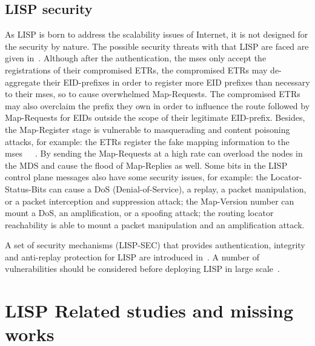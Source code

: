 \subsection{LISP security}
\label{subsubsec:impact_security}
As LISP is born to address the scalability issues of Internet, it is not designed for the security by nature. The possible security threats with that LISP are faced are given in~\cite{rfc7835}. Although after the authentication, the \acrshort{ms}es only accept the registrations of their compromised ETRs, the compromised ETRs may de-aggregate their EID-prefixes in order to register more EID prefixes than necessary to their \acrshort{ms}es, so to cause overwhelmed Map-Requests. The compromised ETRs may also overclaim the prefix they own in order to influence the route followed by Map-Requests for EIDs outside the scope of their legitimate EID-prefix. Besides, the Map-Register stage is vulnerable to masquerading and content poisoning attacks, for example: the ETRs register the fake mapping information to the \acrshort{ms}es~\cite{aiash2013securing}~\cite{montero2013securing}~\cite{aiash2013novel}. By sending the Map-Requests at a high rate can overload the nodes in the MDS and cause the flood of Map-Replies as well. Some bits in the LISP control plane messages also have some security issues, for example: the Locator-Status-Bits can cause a DoS (Denial-of-Service), a replay, a packet manipulation, or a packet interception and suppression attack; the Map-Version number can mount a DoS, an amplification, or a spoofing attack; the routing locator reachability is able to mount a packet manipulation and an amplification attack.

A set of security mechanisms (LISP-SEC) that provides authentication, integrity and anti-replay protection for LISP are introduced in~\cite{maino2017lisp}. A number of vulnerabilities should be considered before deploying LISP in large scale~\cite{raheem2013supporting}.


\section{LISP Related studies and missing works}
\label{subsec:studies_status}


